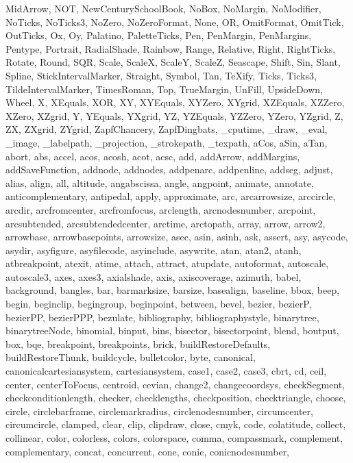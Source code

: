 {{  MidArrow, NOT, NewCenturySchoolBook, NoBox, NoMargin, NoModifier, NoTicks,
  NoTicks3, NoZero, NoZeroFormat, None, OR, OmitFormat, OmitTick, OutTicks,
  Ox, Oy, Palatino, PaletteTicks, Pen, PenMargin, PenMargins, Pentype,
  Portrait, RadialShade, Rainbow, Range, Relative, Right, RightTicks, Rotate,
  Round, SQR, Scale, ScaleX, ScaleY, ScaleZ, Seascape, Shift, Sin, Slant,
  Spline, StickIntervalMarker, Straight, Symbol, Tan, TeXify, Ticks, Ticks3,
  TildeIntervalMarker, TimesRoman, Top, TrueMargin, UnFill, UpsideDown,
  Wheel, X, XEquals, XOR, XY, XYEquals, XYZero, XYgrid, XZEquals, XZZero,
  XZero, XZgrid, Y, YEquals, YXgrid, YZ, YZEquals, YZZero, YZero, YZgrid, Z,
  ZX, ZXgrid, ZYgrid, ZapfChancery, ZapfDingbats, _cputime, _draw, _eval,
  _image, _labelpath, _projection, _strokepath, _texpath, aCos, aSin, aTan,
  abort, abs, accel, acos, acosh, acot, acsc, add, addArrow, addMargins,
  addSaveFunction, addnode, addnodes, addpenarc, addpenline, addseg, adjust,
  alias, align, all, altitude, angabscissa, angle, angpoint, animate,
  annotate, anticomplementary, antipedal, apply, approximate, arc,
  arcarrowsize, arccircle, arcdir, arcfromcenter, arcfromfocus, arclength,
  arcnodesnumber, arcpoint, arcsubtended, arcsubtendedcenter, arctime,
  arctopath, array, arrow, arrow2, arrowbase, arrowbasepoints, arrowsize,
  asec, asin, asinh, ask, assert, asy, asycode, asydir, asyfigure,
  asyfilecode, asyinclude, asywrite, atan, atan2, atanh, atbreakpoint,
  atexit, atime, attach, attract, atupdate, autoformat, autoscale,
  autoscale3, axes, axes3, axialshade, axis, axiscoverage, azimuth, babel,
  background, bangles, bar, barmarksize, barsize, basealign, baseline, bbox,
  beep, begin, beginclip, begingroup, beginpoint, between, bevel, bezier,
  bezierP, bezierPP, bezierPPP, bezulate, bibliography, bibliographystyle,
  binarytree, binarytreeNode, binomial, binput, bins, bisector,
  bisectorpoint, blend, boutput, box, bqe, breakpoint, breakpoints, brick,
  buildRestoreDefaults, buildRestoreThunk, buildcycle, bulletcolor, byte,
  canonical, canonicalcartesiansystem, cartesiansystem, case1, case2, case3,
  cbrt, cd, ceil, center, centerToFocus, centroid, cevian, change2,
  changecoordsys, checkSegment, checkconditionlength, checker, checklengths,
  checkposition, checktriangle, choose, circle, circlebarframe,
  circlemarkradius, circlenodesnumber, circumcenter, circumcircle, clamped,
  clear, clip, clipdraw, close, cmyk, code, colatitude, collect, collinear,
  color, colorless, colors, colorspace, comma, compassmark, complement,
  complementary, concat, concurrent, cone, conic, conicnodesnumber,
}}
